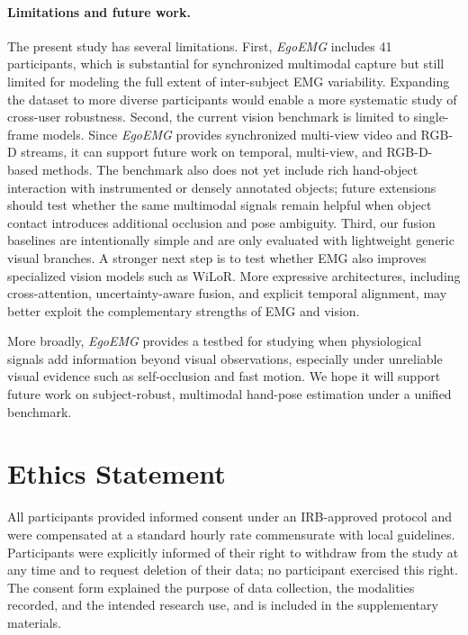 \documentclass{article}
\newcommand{\dataset}{\textit{EgoEMG}}
\begin{document}
\paragraph{Limitations and future work.}
The present study has several limitations. First, \dataset{} includes 41
participants, which is substantial for synchronized multimodal capture but still
limited for modeling the full extent of inter-subject EMG variability. Expanding
the dataset to more diverse participants would enable a more systematic study of
cross-user robustness. Second, the current vision benchmark is limited to single-frame models.
Since \dataset{} provides synchronized multi-view video and RGB-D streams,
it can support future work on temporal, multi-view, and RGB-D-based methods.
The benchmark also does not yet include rich hand-object interaction with instrumented or
densely annotated objects; future extensions should test whether the same
multimodal signals remain helpful when object contact introduces additional
occlusion and pose ambiguity. Third, our fusion baselines are intentionally simple and are only
evaluated with lightweight generic visual branches. A stronger next step is to
test whether EMG also improves specialized vision models such as WiLoR. More expressive architectures, including
cross-attention, uncertainty-aware fusion, and explicit temporal alignment, may
better exploit the complementary strengths of EMG and vision.

More broadly, \dataset{} provides a testbed for studying when physiological
signals add information beyond visual observations, especially under unreliable
visual evidence such as self-occlusion and fast motion. We hope it will support
future work on subject-robust, multimodal hand-pose estimation under a unified
benchmark.

\section*{Ethics Statement}

All participants provided informed consent under an IRB-approved protocol and were compensated at a standard hourly rate commensurate with local guidelines. Participants were explicitly informed of their right to withdraw from the study at any time and to request deletion of their data; no participant exercised this right. The consent form explained the purpose of data collection, the modalities recorded, and the intended research use, and is included in the supplementary materials.
\end{document}
